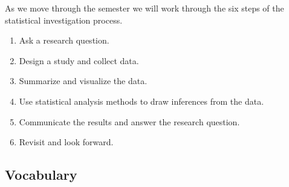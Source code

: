 \documentclass[
]{report}
\begin{document}
As we move through the semester we will work through the six steps of the statistical investigation process.

\begin{enumerate}
\def\labelenumi{\arabic{enumi}.}
\item
  Ask a research question.
\item
  Design a study and collect data.
\item
  Summarize and visualize the data.
\item
  Use statistical analysis methods to draw inferences from the data.
\item
  Communicate the results and answer the research question.
\item
  Revisit and look forward.
\end{enumerate}

\subsection{Vocabulary}\label{vocabulary-2}
\end{document}
